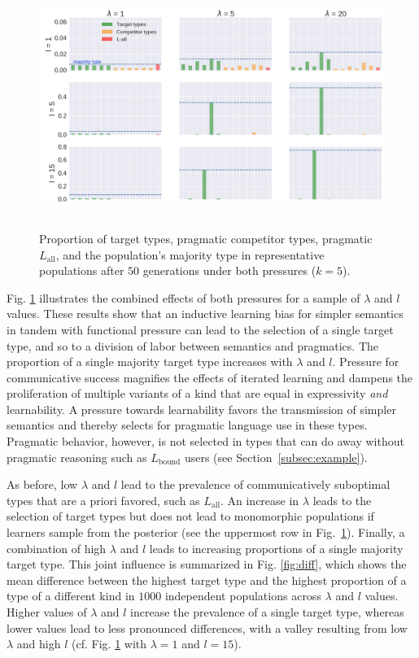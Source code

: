 \documentclass[a4paper, 11pt]{article}
\theoremstyle{Satz}
\newcommand{\hl}[1]{\textcolor[rgb]{.8,.33,.0}{#1}}%
\newcommand{\mylang}[1]{\ensuremath{L_{\text{#1}}}\xspace} %
\newcommand{\Lall}{\mylang{all}}
\newcommand{\Lbound}{\mylang{bound}}
\begin{document}
\begin{figure}[t]
\centering
\includegraphics[width=1\textwidth,height=8cm,keepaspectratio]{./plots/alt-fig3-r+m}
\caption{Proportion of target types, \hl{pragmatic} competitor types, \hl{pragmatic} $\Lall$, and the population's majority type in representative populations after $50$ generations under both pressures ($k = 5$).}
\label{fig:rmd}
\end{figure}

Fig. \ref{fig:rmd} illustrates the combined effects of both pressures for a sample of
$\lambda$ and $l$ values. These results show that an inductive learning bias for simpler
semantics in tandem with functional pressure can lead to the selection of a single target
type, and so to a division of labor between semantics and pragmatics.
The proportion of a single majority target type increases with $\lambda$ and
$l$. Pressure for communicative success magnifies the effects of iterated learning and dampens
the proliferation of multiple variants of a kind that are equal in expressivity {\em and} learnability. A pressure towards learnability favors the transmission of simpler semantics and thereby selects for pragmatic language use in these types. Pragmatic behavior, however, is not selected in types that can do away without pragmatic reasoning such as $\Lbound$ users (see Section~\ref{subsec:example}). 

As before, low $\lambda$ and $l$ lead to the prevalence of communicatively suboptimal types
that are a priori favored, such as $\Lall$. An increase in $\lambda$ leads to the selection of
target types but does not lead to monomorphic populations if learners sample from the posterior (see the uppermost row in Fig.~\ref{fig:rmd}). Finally, a combination of high $\lambda$ and $l$ leads to increasing proportions of a single majority target type. This joint influence is summarized in Fig. \ref{fig:diff}, which shows the mean difference between the highest target type and the highest proportion of a type of a different kind in $1000$ independent populations across $\lambda$ and $l$ values. Higher values of $\lambda$ and $l$ increase the prevalence of a single target type, whereas lower values lead to less pronounced differences, with a valley resulting from low $\lambda$ and high $l$ (cf. Fig. \ref{fig:rmd} with $\lambda = 1$ and $l=15$). 
\end{document}
